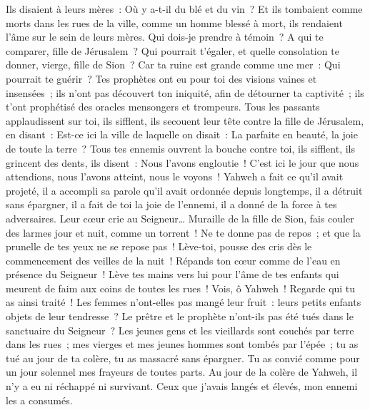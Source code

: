 \begin{multicols}{2}
 Ils disaient à leurs mères~: Où y a-t-il du blé et du vin~? Et ils tombaient comme morts dans les rues de la ville, comme un homme blessé à mort, ils rendaient l'âme sur le sein de leurs mères.
 Qui dois-je prendre à témoin~? A qui te comparer, fille de Jérusalem~? Qui pourrait t'égaler, et quelle consolation te donner, vierge, fille de Sion~? Car ta ruine est grande comme une mer~: Qui pourrait te guérir~?
 Tes prophètes ont eu pour toi des visions vaines et insensées~; ils n'ont pas découvert ton iniquité, afin de détourner ta captivité~; ils t'ont prophétisé des oracles mensongers et trompeurs.
 Tous les passants applaudissent sur toi, ils sifflent, ils secouent leur tête contre la fille de Jérusalem, en disant~: Est-ce ici la ville de laquelle on disait~: La parfaite en beauté, la joie de toute la terre~?
 Tous tes ennemis ouvrent la bouche contre toi, ils sifflent, ils grincent des dents, ils disent~: Nous l'avons engloutie~! C'est ici le jour que nous attendions, nous l'avons atteint, nous le voyons~!
 Yahweh a fait ce qu'il avait projeté, il a accompli sa parole qu'il avait ordonnée depuis longtemps, il a détruit sans épargner, il a fait de toi la joie de l'ennemi, il a donné de la force à tes adversaires.
 Leur cœur crie au Seigneur… Muraille de la fille de Sion, fais couler des larmes jour et nuit, comme un torrent~! Ne te donne pas de repos~; et que la prunelle de tes yeux ne se repose pas~!
 Lève-toi, pousse des cris dès le commencement des veilles de la nuit~! Répands ton cœur comme de l'eau en présence du Seigneur~! Lève tes mains vers lui pour l'âme de tes enfants qui meurent de faim aux coins de toutes les rues~!
 Vois, ô Yahweh~! Regarde qui tu as ainsi traité~! Les femmes n'ont-elles pas mangé leur fruit~: leurs petits enfants objets de leur tendresse~? Le prêtre et le prophète n'ont-ils pas été tués dans le sanctuaire du Seigneur~?
 Les jeunes gens et les vieillards sont couchés par terre dans les rues~; mes vierges et mes jeunes hommes sont tombés par l'épée~; tu as tué au jour de ta colère, tu as massacré sans épargner.
 Tu as convié comme pour un jour solennel mes frayeurs de toutes parts. Au jour de la colère de Yahweh, il n'y a eu ni réchappé ni survivant. Ceux que j'avais langés et élevés, mon ennemi les a consumés.

\end{multicols}
